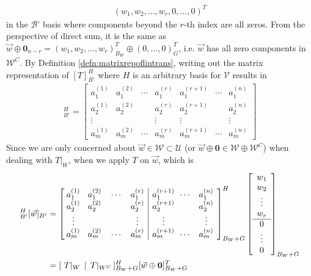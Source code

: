 \begin{align*}
(w_1, w_2, \ldots, w_r, 0, \ldots, 0)^T
\end{align*}
in the $\mathcal{B}$' basis where components beyond the $r$-th index are all zeros. From the perspective of direct sum, it is the same as $\vec{w} \oplus \textbf{0}_{n-r} = (w_1, w_2, \ldots, w_r)_{B_W}^T \oplus (0, \ldots, 0)_{G}^T$, i.e. $\vec{w}$ has all zero components in $\mathcal{W}^C$. By Definition \ref{defn:matrixrepoflintrans}, writing out the matrix representation of $[T]_{B'}^H$ where $H$ is an arbitrary basis for $\mathcal{V}$ results in
\begin{align*}
[T]_{B'}^H = \begin{bmatrix}
a_1^{(1)} & a_1^{(2)} & \cdots & a_1^{(r)} & a_1^{(r+1)} & \cdots & a_1^{(n)} \\
a_2^{(1)} & a_2^{(2)} & & a_2^{(r)} & a_2^{(r+1)} & & a_2^{(n)} \\
\vdots & & & \vdots & \vdots & & \vdots \\
a_m^{(1)} & a_m^{(2)} & \cdots & a_m^{(r)} & a_m^{(r+1)} & \cdots & a_m^{(n)}
\end{bmatrix}
\end{align*}
Since we are only concerned about $\vec{w} \in \mathcal{W} \subset \mathcal{U}$ (or $\vec{w} \oplus \textbf{0} \in \mathcal{W} \oplus \mathcal{W}^C$) when dealing with $T|_W$, when we apply $T$ on $\vec{w}$, which is
\begin{align*}
[T]_{B'}^H[\vec{w}]_{B'}
&=
\left[\begin{array}{@{\;}wc{15pt}wc{15pt}wc{15pt}wc{15pt}|@{\quad}wc{15pt}wc{15pt}wc{15pt}}
a_1^{(1)} & a_1^{(2)} & \cdots & a_1^{(r)} & a_1^{(r+1)} & \cdots & a_1^{(n)} \\
a_2^{(1)} & a_2^{(2)} & & a_2^{(r)} & a_2^{(r+1)} & & a_2^{(n)} \\
\vdots & & & \vdots & \vdots & & \vdots \\
a_m^{(1)} & a_m^{(2)} & \cdots & a_m^{(r)} & a_m^{(r+1)} & \cdots & a_m^{(n)}
\end{array}\right]_{B_W+G}^H
\left[\begin{array}{c}
w_1 \\
w_2 \\
\vdots \\
w_r \\
\hline
0 \\
\vdots \\
0
\end{array}\right]_{B_W+G} \\
&= [\,\, T|_W \,\mid\, T|_{W^C} \,]_{B_W+G}^H [\vec{w} \oplus \textbf{0}]^T_{B_W+G} \\
\end{align*}
